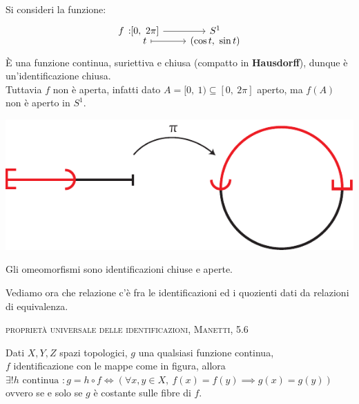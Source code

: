\begin{example}
	Si consideri la funzione:
	\begin{equation*}
		\funztot f {[0, \ 2\pi]} {S^1} t {(\cos t, \ \sin t)}
	\end{equation*}
	È una funzione continua, suriettiva e chiusa (compatto in \textbf{Hausdorff}), dunque è un'identificazione chiusa. \\
	Tuttavia $f$ non è aperta, infatti dato $A=[0, \ 1)\subseteq [0, \ 2\pi]$ aperto, ma $f(A)$ non è aperto in $S^1$.
		\begin{center}
			\includegraphics[trim=0cm 0cm 0cm 0cm,clip,scale=0.9]{images/half_circle-eps-converted-to.pdf}
		\end{center}
	\vspace{-6mm}
\end{example}
\begin{observe}
	Gli omeomorfismi sono identificazioni chiuse e aperte.
\end{observe}
Vediamo ora che relazione c'è fra le identificazioni ed i quozienti dati da relazioni di equivalenza.
\begin{theorema} \textsc{proprietà universale delle identificazioni, Manetti, 5.6} \\
	\begin{minipage}[t]{0.83\textwidth}
		Dati $X,Y,Z$ spazi topologici, $g$ una qualsiasi funzione continua, \\
		$f$ identificazione con le mappe come in figura, allora \\
		$\exists ! h \text{ continua } \colon g=h\circ f \iff \left( \forall x,y\in X, \ f(x)=f(y)\implies g(x)=g(y)  \right)$ \\
		ovvero se e solo se $g$ è costante sulle fibre di $f$.
	\end{minipage}
	\begin{minipage}[t]{0.13\textwidth}\vspace{-10pt}
	\end{minipage}
\end{theorema}
